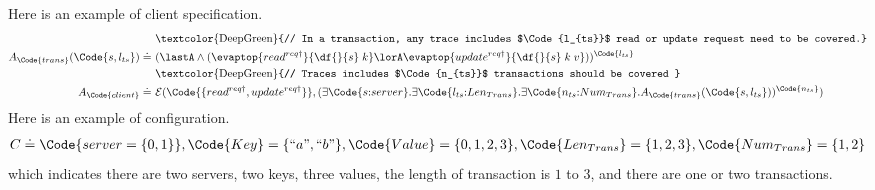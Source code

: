 Here is an example of client specification.
{\small\begin{align*}
        &\ \text{\textcolor{DeepGreen}{// In a transaction, any trace includes $\Code{l_{ts}}$ read or update request need to be covered.}}
        \\A_\Code{trans}(\Code{s, l_{ts}}) \doteq&\ (\lastA \land (\evaptop{read^{req\dagger}}{\df{}{s}\;k} \lorA \evaptop{update^{req\dagger}}{\df{}{s}\;k\; v}))^{\Code{l_{ts}}}
         \\&\ \text{\textcolor{DeepGreen}{// Traces includes $\Code{n_{ts}}$ transactions should be covered }}
        \\A_\Code{client} \doteq&\ \mathcal{E}( \Code{\{
        read^{req\dagger},
        update^{req\dagger}
        \}}, ( \exists \Code{s{:}server}.\exists\Code{l_{ts}{:}Len_{Trans}}.\exists\Code{n_{ts}{:}Num_{Trans}}. A_\Code{trans}(\Code{s, l_{ts}}))^{\Code{n_{ts}}})
    \end{align*}}\noindent
Here is an example of configuration.
{\small\begin{align*}
C \doteq \Code{server = \{0, 1\}}, \Code{Key} = \{ ``a", ``b"\}, \Code{Value} = \{ 0, 1, 2, 3\}, \Code{Len_{Trans}} = \{ 1, 2, 3\}, \Code{Num_{Trans}} = \{ 1, 2\}
\end{align*}}\noindent
which indicates there are two servers, two keys, three values, the length of transaction is $1$ to $3$, and there are one or two transactions.

